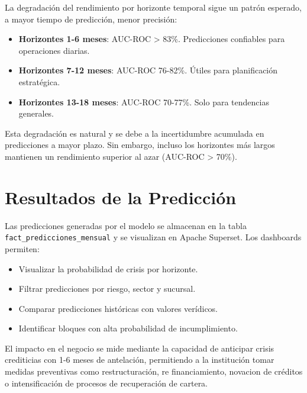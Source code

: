 La degradación del rendimiento por horizonte temporal sigue un patrón esperado, a mayor tiempo de predicción, menor precisión:

\begin{itemize}
    \item \textbf{Horizontes 1-6 meses}: AUC-ROC > 83\%. Predicciones confiables para operaciones diarias.
    \item \textbf{Horizontes 7-12 meses}: AUC-ROC 76-82\%. Útiles para planificación estratégica.
    \item \textbf{Horizontes 13-18 meses}: AUC-ROC 70-77\%. Solo para tendencias generales.
\end{itemize}

Esta degradación es natural y se debe a la incertidumbre acumulada en predicciones a mayor plazo. Sin embargo, incluso los horizontes más largos mantienen un rendimiento superior al azar (AUC-ROC > 70\%).

\section{Resultados de la Predicción}

Las predicciones generadas por el modelo se almacenan en la tabla \texttt{fact\_predicciones\_mensual} y se visualizan en Apache Superset. Los dashboards permiten:

\begin{itemize}    
    \item Visualizar la probabilidad de crisis por horizonte.
    \item Filtrar predicciones por riesgo, sector y sucursal.
    \item Comparar predicciones históricas con valores verídicos.
    \item Identificar bloques con alta probabilidad de incumplimiento.
\end{itemize}

El impacto en el negocio se mide mediante la capacidad de anticipar crisis crediticias con 1-6 meses de antelación, permitiendo a la institución tomar medidas preventivas como restructuración, re financiamiento, novacion de créditos o intensificación de procesos de recuperación de cartera.

